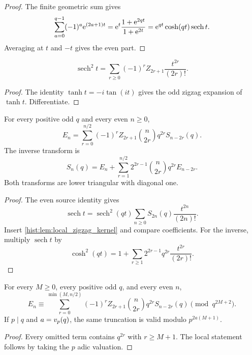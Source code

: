 \begin{proof}
The finite geometric sum gives
\[
\sum_{a=0}^{q-1}(-1)^a\mathrm e^{(2a+1)t}
=
\mathrm e^t\frac{1+\mathrm e^{2qt}}{1+\mathrm e^{2t}}
=
\mathrm e^{qt}\cosh(qt)\operatorname{sech}t.
\]
Averaging at \(t\) and \(-t\) gives the even part.
\end{proof}

\begin{histlemma}\label{hist:lem:local_zigzag_kernel}
\[
\boxed{
\operatorname{sech}^2t
=
\sum_{r\geq0}
(-1)^rZ_{2r+1}
\frac{t^{2r}}{(2r)!}.
}
\]
\end{histlemma}

\begin{proof}
The identity \(\tanh t=-i\tan(it)\) gives the odd zigzag expansion of \(\tanh t\). Differentiate.
\end{proof}

\begin{histtheorem}\label{hist:thm:odd_coordinate_pair}
For every positive odd \(q\) and every even \(n\geq0\),
\[
\boxed{
E_n
=
\sum_{r=0}^{n/2}
(-1)^rZ_{2r+1}
\binom n{2r}
q^{2r}S_{n-2r}(q).
}
\]
The inverse transform is
\[
\boxed{
S_n(q)
=
E_n
+
\sum_{r=1}^{n/2}
2^{2r-1}
\binom n{2r}
q^{2r}E_{n-2r}.
}
\]
Both transforms are lower triangular with diagonal one.
\end{histtheorem}

\begin{proof}
The even source identity gives
\[
\operatorname{sech}t
=
\operatorname{sech}^2(qt)
\sum_{n\geq0}S_{2n}(q)\frac{t^{2n}}{(2n)!}.
\]
Insert \cref{hist:lem:local_zigzag_kernel} and compare coefficients. For the inverse, multiply \(\operatorname{sech}t\) by
\[
\cosh^2(qt)
=
1+
\sum_{r\geq1}2^{2r-1}q^{2r}\frac{t^{2r}}{(2r)!}.
\]
\end{proof}

\begin{histcorollary}\label{hist:cor:odd_modulus_truncation}
For every \(M\geq0\), every positive odd \(q\), and every even \(n\),
\[
\boxed{
E_n
\equiv
\sum_{r=0}^{\min(M,n/2)}
(-1)^rZ_{2r+1}
\binom n{2r}q^{2r}S_{n-2r}(q)
\pmod {q^{2M+2}}.
}
\]
If \(p\mid q\) and \(a=v_p(q)\), the same truncation is valid modulo \(p^{2a(M+1)}\).
\end{histcorollary}

\begin{proof}
Every omitted term contains \(q^{2r}\) with \(r\geq M+1\). The local statement follows by taking the \(p\) adic valuation.
\end{proof}

